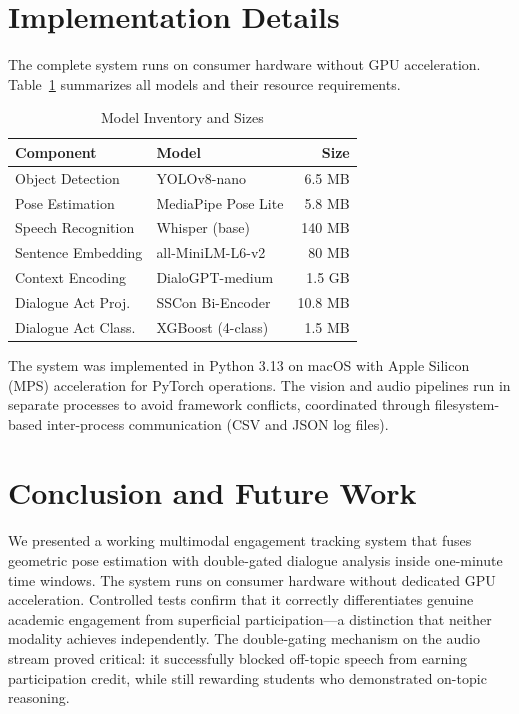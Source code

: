 \documentclass[conference]{IEEEtran}
\begin{document}
\section{Implementation Details}
The complete system runs on consumer hardware without GPU acceleration. Table~\ref{tab:models} summarizes all models and their resource requirements.
\begin{table}[htbp]
\caption{Model Inventory and Sizes}
\begin{center}
\begin{tabular}{|l|l|r|}
\hline
\textbf{Component} & \textbf{Model} & \textbf{Size} \\
\hline
Object Detection & YOLOv8-nano & 6.5 MB \\
Pose Estimation & MediaPipe Pose Lite & 5.8 MB \\
Speech Recognition & Whisper (base) & 140 MB \\
Sentence Embedding & all-MiniLM-L6-v2 & 80 MB \\
Context Encoding & DialoGPT-medium & 1.5 GB \\
Dialogue Act Proj. & SSCon Bi-Encoder & 10.8 MB \\
Dialogue Act Class. & XGBoost (4-class) & 1.5 MB \\
\hline
\end{tabular}
\label{tab:models}
\end{center}
\end{table}
The system was implemented in Python 3.13 on macOS with Apple Silicon (MPS) acceleration for PyTorch operations. The vision and audio pipelines run in separate processes to avoid framework conflicts, coordinated through filesystem-based inter-process communication (CSV and JSON log files).

\section{Conclusion and Future Work}
We presented a working multimodal engagement tracking system that fuses geometric pose estimation with double-gated dialogue analysis inside one-minute time windows. The system runs on consumer hardware without dedicated GPU acceleration. Controlled tests confirm that it correctly differentiates genuine academic engagement from superficial participation---a distinction that neither modality achieves independently. The double-gating mechanism on the audio stream proved critical: it successfully blocked off-topic speech from earning participation credit, while still rewarding students who demonstrated on-topic reasoning.
\end{document}
